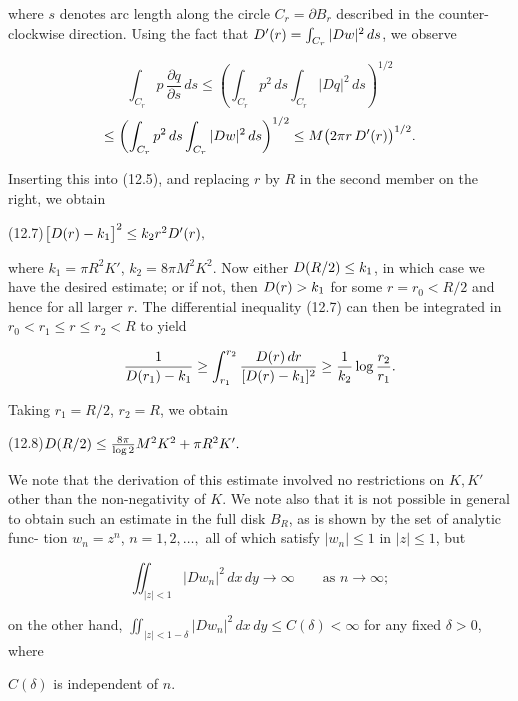 \noindent where $s$ denotes arc length along the circle $C_r=\partial B_r$ described in the counter-
clockwise direction. Using the fact that $D'(r)=\int_{C_r}|Dw|^2\,ds$, we observe

\begin{equation}\tag{12.6}
\int_{C_r}p\,\frac{\partial q}{\partial s}\,ds\le
\left(\int_{C_r}p^2\,ds\int_{C_r}|Dq|^2\,ds\right)^{1/2}
\end{equation}
\[
\le \left(\int_{C_r}p^2\,ds\int_{C_r}|Dw|^2\,ds\right)^{1/2}
\le M\bigl(2\pi r\,D'(r)\bigr)^{1/2}.
\]





\noindent Inserting this into (12.5), and replacing $r$ by $R$ in the second member on the right,
we obtain

\medskip

\noindent (12.7)\qquad $\bigl[D(r)-k_1\bigr]^2\leq k_2 r^2D'(r),$

\medskip

\noindent where $k_1=\pi R^2K'$, $k_2=8\pi M^2K^2$. Now either $D(R/2)\leq k_1$, in which case we have
the desired estimate; or if not, then $D(r)>k_1$ for some $r=r_0<R/2$ and hence
for all larger $r$. The differential inequality (12.7) can then be integrated in
$r_0<r_1\leq r\leq r_2<R$ to yield

\[
\frac{1}{D(r_1)-k_1}\geq \int_{r_1}^{r_2}\frac{D(r)\,dr}{[D(r)-k_1]^2}\geq \frac{1}{k_2}\log\frac{r_2}{r_1}.
\]

\noindent Taking $r_1=R/2$, $r_2=R$, we obtain

\medskip

\noindent (12.8)\qquad $D(R/2)\leq \frac{8\pi}{\log 2}M^2K^2+\pi R^2K'.$

\medskip

\noindent We note that the derivation of this estimate involved no restrictions on $K, K'$
other than the non-negativity of $K$. We note also that it is not possible in general to
obtain such an estimate in the full disk $B_R$, as is shown by the set of analytic func-
tion $w_n=z^n$, $n=1,2,\dots,$ all of which satisfy $|w_n|\leq 1$ in $|z|\leq 1$, but

\[
\iint_{|z|<1}|Dw_n|^2\,dx\,dy\to\infty\qquad\text{as }n\to\infty;
\]

\noindent on the other hand, $\iint_{|z|<1-\delta}|Dw_n|^2\,dx\,dy\leq C(\delta)<\infty$ for any fixed $\delta>0$, where

\noindent $C(\delta)$ is independent of $n$.

